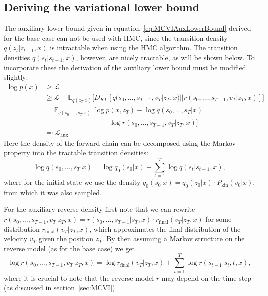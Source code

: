 \documentclass[12pt]{scrartcl}
\newcommand{\E}{\mathbb{E}}
\begin{document}
\subsection{Deriving the variational lower bound}

The auxiliary lower bound given in equation~\eqref{eq:MCVIAuxLowerBound} derived for the base case can not be used with HMC, since the transition density $q(z_t|z_{t-1}, x)$ is intractable when using the HMC algorithm. The transition densities $q(s_t|s_{t-1}, x)$, however, are nicely tractable, as will be shown below. To incorporate these the derivation of the auxiliary lower bound must be modified slightly:
\begin{equation}
\begin{split}
\log p(x) & \geq \mathcal{L} \\
& \geq \mathcal{L} - \E_{q(z_T|x)} \big[ D_{KL}[q(s_0, \dots, s_{T-1}, v_T | z_T, x) || r(s_0, \dots, s_{T-1}, v_T | z_T, x)] \big] \\
& = \E_{q(s_0, \ldots, s_T|x)} \Big[ \log p(x, z_T) - \log q(s_0, \ldots, s_T|x) \\
& 	\qquad\qquad\qquad\qquad 							+ \log r(s_0, \ldots, s_{T-1}, v_T | z_T, x) \Big] \\
& \eqqcolon \mathcal{L}_{\textrm{aux}}
\end{split}
\end{equation}
Here the density of the forward chain can be decomposed using the Markov property into the tractable transition densities:
\begin{equation}
\log q(s_0, \ldots, s_T|x) = \log q_0(s_0|x) + \sum \limits_{t=1}^T \log q(s_t|s_{t-1}, x),
\end{equation}
where for the initial state we use the density $q_0(s_0|x) = q_0(z_0|x) \cdot P_\textrm{kin}(v_0|x)$, from which it was also sampled.

For the auxiliary reverse density first note that we can rewrite $r(s_0, \ldots, s_{T-1}, v_T | z_T, x) = r(s_0, \ldots, s_{T-1}| s_T, x) \cdot r_{\textrm{final}}(v_T | z_T, x)$ for some distribution $r_{\textrm{final}}(v_T|z_T, x)$, which approximates the final distribution of the velocity $v_T$ given the position $z_T$. By then assuming a Markov structure on the reverse model (as for the base case) we get
\begin{equation}
\log r(s_0, \dots, s_{T-1}, v_T | z_T, x) = \log r_{\textrm{final}}(v_T | z_T, x) + \sum \limits_{t=1}^T \log r(s_{t-1}|s_t, t, x),
\end{equation}
where it is crucial to note that the reverse model $r$ may depend on the time step (as discussed in section~\ref{sec:MCVI}).
\end{document}
